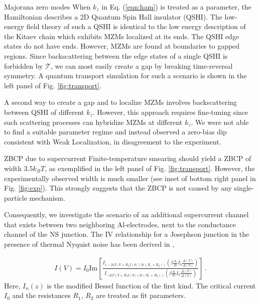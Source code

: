 \documentclass[final]{beamer}
\newlength{\onecolwid}
\begin{document}
\begin{frame}[t]
\begin{columns}[t]
\begin{column}{\onecolwid}
\begin{block}{Majorana zero modes}
When $k_z$ in Eq. (\ref{eqn:ham}) is treated as a parameter, the
	Hamiltonian describes a 2D Quantum Spin Hall insulator (QSHI). The
	low-energy field theory of such a QSHI is identical to the low energy
	description of the Kitaev chain which exhibits MZMs localized at its ends.
	The QSHI edge states do not have ends. However, MZMs are found at
	boundaries to gapped regions. Since backscattering between the edge
	states of a single QSHI is forbidden by $\mathcal{T}$, 
	we can most easily create a gap by
	breaking time-reversal symmetry. A quantum transport simulation for such
	a scenario is shown in the left panel of Fig. \ref{fig:transport}. 
	
	A second way to create a gap and to localize MZMs 
	involves backscattering between
	QSHI of different $k_z$. However, this approach
	requires fine-tuning since such
	scattering processes can hybridize MZMs at different $k_z$. We were not
	able to find a suitable parameter regime and instead observed a zero-bias
	dip consistent with Weak Localization, in disagreement to the
	experiment.

\end{block}

\begin{block}{ZBCP due to supercurrent}
	Finite-temperature smearing should yield a ZBCP of width $3.5k_B T$, as
	exemplified in the left panel of Fig. \ref{fig:transport}. However, the experimentally
	observed width is much smaller (see inset of bottom right panel in
	Fig. \ref{fig:exp}). This strongly suggests that the ZBCP 
	is not caused by any
	single-particle mechanism.

	Consequently, we investigate the scenario of an additional 
	supercurrent channel that
	exists between two neighboring Al-electrodes, next to the
	conductance channel of the NS junction. The IV
	relationship for a Josephson junction 
	in the presence of thermal Nyquist noise has been derived
	in \cite{Ivanchenko},



\begin{eqnarray}
	\label{eqn:zilberman}
  I(V) = I_0 \text{Im} \left[\frac{I_{1-2 i \beta (V + R_2 I) \hbar/(2e
  (R_1+R_2))}(\beta \frac{\hbar}{2e}I_0 \frac{\Delta(T)}{\Delta(0)})}{I_{-2 i
  \beta (V + R_2 I) \hbar/(2e (R_1+R_2))}(\beta \frac{\hbar}{2e}I_0
  \frac{\Delta(T)}{\Delta(0)})}\right] \,.
\end{eqnarray}
Here, $I_n(z)$ is the modified Bessel function of the first kind.
The critical current $I_0$ and the resistances $R_1$, $R_2$ are treated as fit
parameters.


\end{block}
\end{column}
\end{columns}
\end{frame}
\end{document}
